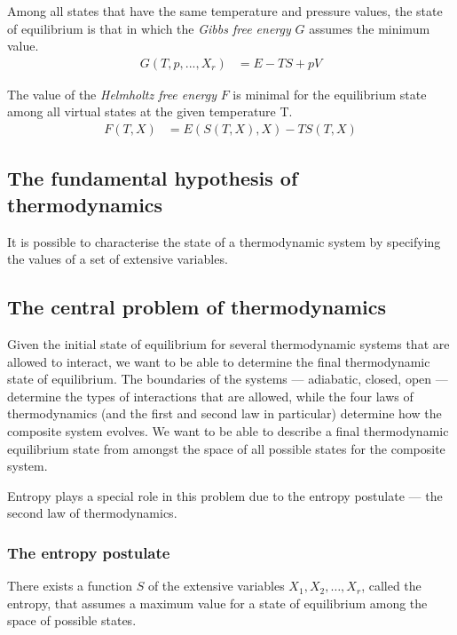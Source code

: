 Among all states that have the same temperature and pressure values, the state of equilibrium is that in which the \textit{Gibbs free energy} $G$ assumes the minimum value.
\begin{align*}
	G(T, p, ..., X_{r})  &= E - TS + pV
\end{align*}

The value of the \textit{Helmholtz free energy} $F$ is minimal for the equilibrium state among all virtual states at the given temperature T.
\begin{align*}
	F(T, X) &= E(S(T, X), X) - TS(T, X)
\end{align*}


\subsection{The fundamental hypothesis of thermodynamics}
It is possible to characterise the state of a thermodynamic system by specifying the values of a set of extensive variables.

\subsection{The central problem of thermodynamics}
Given the initial state of equilibrium for several thermodynamic systems that are allowed to interact, we want to be able to determine the final thermodynamic state of equilibrium. The boundaries of the systems --- adiabatic, closed, open --- determine the types of interactions that are allowed, while the four laws of thermodynamics (and the first and second law in particular) determine how the composite system evolves. We want to be able to describe a final thermodynamic equilibrium state from amongst the space of all possible states for the composite system.

Entropy plays a special role in this problem due to the entropy postulate --- the second law of thermodynamics.

\subsubsection*{The entropy postulate}
There exists a function $S$ of the extensive variables $X_1,X_2,\ldots,X_r$, called the entropy, that assumes a maximum value for a state of equilibrium among the space of possible states.

